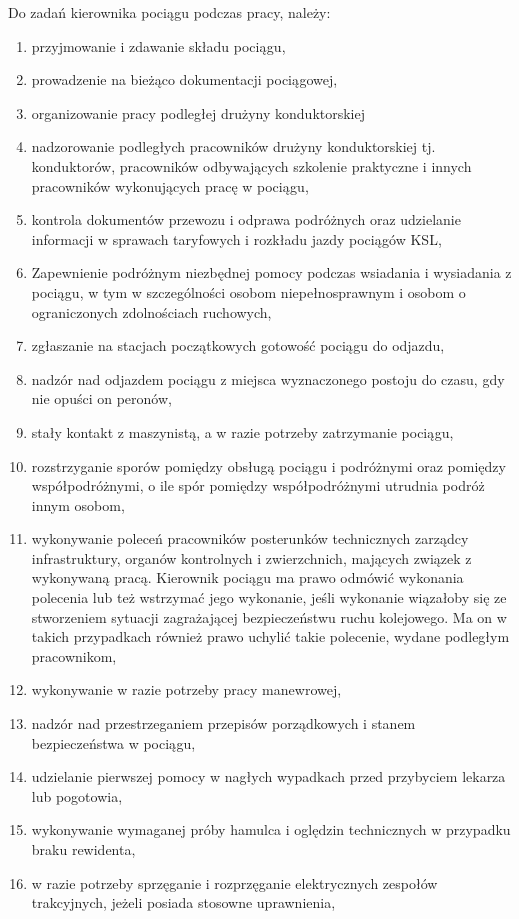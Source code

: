 Do zadań kierownika pociągu podczas pracy, należy:
\begin{enumerate}
	\item przyjmowanie i zdawanie składu pociągu,
	\item prowadzenie na bieżąco dokumentacji pociągowej,
	\item organizowanie pracy podległej drużyny konduktorskiej
	\item nadzorowanie podległych pracowników drużyny konduktorskiej tj. konduktorów, pracowników odbywających szkolenie praktyczne i innych
	pracowników wykonujących pracę w pociągu,
	\item kontrola dokumentów przewozu i odprawa podróżnych oraz udzielanie informacji w sprawach taryfowych i rozkładu jazdy pociągów KSL,
	\item Zapewnienie podróżnym niezbędnej pomocy podczas wsiadania i wysiadania z pociągu, w tym w szczególności osobom niepełnosprawnym i osobom
	o ograniczonych zdolnościach ruchowych,
	\item zgłaszanie na stacjach początkowych gotowość pociągu do odjazdu,
	\item nadzór nad odjazdem pociągu z miejsca wyznaczonego postoju do czasu, gdy nie opuści on peronów,
	\item stały kontakt z maszynistą, a w razie potrzeby zatrzymanie pociągu,
	\item rozstrzyganie sporów pomiędzy obsługą pociągu i podróżnymi oraz pomiędzy współpodróżnymi, o ile spór pomiędzy współpodróżnymi utrudnia podróż innym osobom,
	\item wykonywanie poleceń pracowników posterunków technicznych zarządcy	infrastruktury, organów kontrolnych i zwierzchnich, mających związek
	z wykonywaną pracą. Kierownik pociągu ma prawo odmówić wykonania polecenia lub też wstrzymać jego wykonanie, jeśli wykonanie wiązałoby się ze
	stworzeniem sytuacji zagrażającej bezpieczeństwu ruchu kolejowego. Ma on w takich przypadkach również prawo uchylić takie polecenie, wydane
	podległym pracownikom,
	\item wykonywanie w razie potrzeby pracy manewrowej,
	\item nadzór nad przestrzeganiem przepisów porządkowych i stanem bezpieczeństwa w pociągu,
	\item udzielanie pierwszej pomocy w nagłych wypadkach przed przybyciem lekarza lub pogotowia,
	\item wykonywanie wymaganej próby hamulca i oględzin technicznych w przypadku braku rewidenta,
	\item w razie potrzeby sprzęganie i rozprzęganie elektrycznych zespołów trakcyjnych, jeżeli posiada stosowne uprawnienia,

\end{enumerate}
